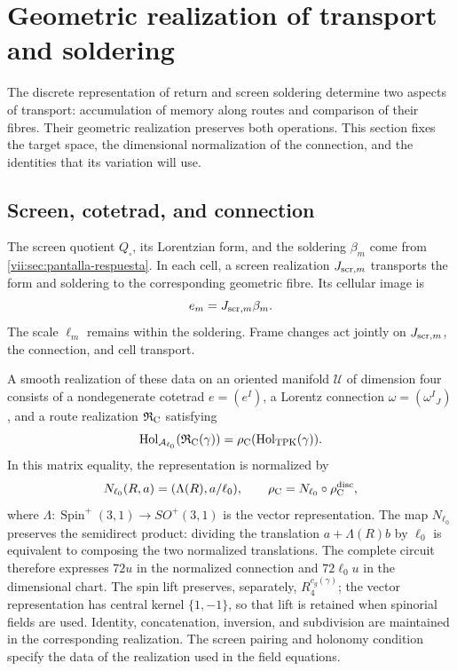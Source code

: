 
\section{Geometric realization of transport and soldering}
\label{vii:sec:realizacion-cartan}

The discrete representation of return and screen soldering
determine two aspects of transport: accumulation of memory along
routes and comparison of their fibres. Their geometric realization
preserves both operations. This section fixes the target
space, the dimensional normalization of the connection, and the identities
that its variation will use.

\subsection{Screen, cotetrad, and connection}

The screen quotient \(Q_\square\), its Lorentzian form, and the
soldering \(\beta_m\) come from
\ref{vii:sec:pantalla-respuesta}. In each cell, a screen
realization \(J_{{\rm scr},m}\) transports the form and soldering
to the corresponding geometric fibre. Its cellular image is
\[
 e_m=J_{{\rm scr},m}\beta_m.
\]
The scale \(\ell_m\) remains within the soldering. Frame
changes act jointly on \(J_{{\rm scr},m}\), the connection,
and cell transport.

A smooth realization of these data on an oriented manifold
\(\mathcal U\) of dimension four consists of a nondegenerate
cotetrad \(e=(e^I)\), a Lorentz connection
\(\omega=(\omega^I{}_J)\), and a route realization
\(\mathfrak R_{\rm C}\) satisfying
\begin{equation}
 \operatorname{Hol}_{\mathcal A_{\ell_0}}
       (\mathfrak R_{\rm C}(\gamma))
 =\rho_{\rm C}(\operatorname{Hol}_{\rm TPK}(\gamma)).
 \label{vii:eq:compatibilidad-holonomia-geometrica}
\end{equation}
In this matrix equality, the representation is normalized by
\[
 N_{\ell_0}(R,a)=(\Lambda(R),a/\ell_0),\qquad
 \rho_{\rm C}=N_{\ell_0}\circ\rho_{\rm C}^{\rm disc},
\]
where \(\Lambda:\operatorname{Spin}^+(3,1)\to SO^+(3,1)\)
is the vector representation. The map \(N_{\ell_0}\)
preserves the semidirect product: dividing the translation
\(a+\Lambda(R)b\) by \(\ell_0\) is equivalent to composing
the two normalized translations. The complete circuit therefore expresses
\(72u\) in the normalized connection and \(72\ell_0u\) in the
dimensional chart. The spin lift preserves, separately,
\(R_4^{c_g(\gamma)}\); the vector representation has central
kernel \(\{1,-1\}\), so that lift is retained when
spinorial fields are used.
Identity, concatenation, inversion, and subdivision are maintained in the
corresponding realization. The screen pairing and holonomy condition
specify the data of the realization used in the field equations.

